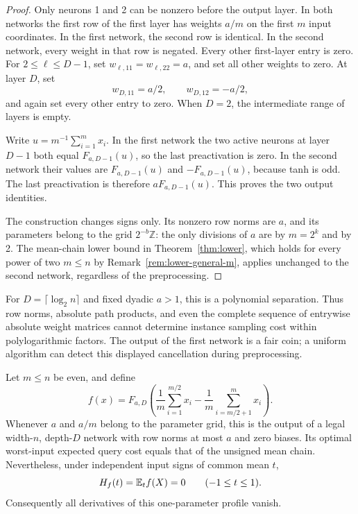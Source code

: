 \begin{proof}
Only neurons 1 and 2 can be nonzero before the output layer.
In both networks the first row of the first layer has weights
\(a/m\) on the first \(m\) input coordinates.  In the first network,
the second row is identical.  In the second network, every weight
in that row is negated.  Every other first-layer entry is zero.
For \(2\le\ell\le D-1\), set
\(w_{\ell,11}=w_{\ell,22}=a\), and set all other weights to zero.
At layer \(D\), set
\[
  w_{D,11}=a/2,\qquad w_{D,12}=-a/2,
\]
and again set every other entry to zero.  When \(D=2\), the
intermediate range of layers is empty.

Write \(u=m^{-1}\sum_{i=1}^m x_i\).  In the first network the two
active neurons at layer \(D-1\) both equal \(F_{a,D-1}(u)\), so
the last preactivation is zero.  In the second network their values
are \(F_{a,D-1}(u)\) and \(-F_{a,D-1}(u)\), because tanh is odd.
The last preactivation is therefore \(aF_{a,D-1}(u)\).
This proves the two output identities.

The construction changes signs only.  Its nonzero row norms are
\(a\), and its parameters belong to the grid \(2^{-b}\mathbb Z\):
the only divisions of \(a\) are by \(m=2^k\) and by 2.
The mean-chain lower bound in Theorem~\ref{thm:lower}, which holds
for every power of two \(m\le n\) by
Remark~\ref{rem:lower-general-m}, applies unchanged to the second
network, regardless of the preprocessing.
\end{proof}

For \(D=\lceil\log_2n\rceil\) and fixed dyadic \(a>1\), this
is a polynomial separation.  Thus row norms, absolute path products,
and even the complete sequence of entrywise absolute weight matrices
cannot determine instance sampling cost within polylogarithmic
factors.  The output of the first network is a fair coin; a uniform
algorithm can detect this displayed cancellation during preprocessing.

\begin{proposition}
\label{prop:profile-obstruction}
Let \(m\le n\) be even, and define
\[
 f(x)=F_{a,D}\left(
 \frac1m\sum_{i=1}^{m/2}x_i-
 \frac1m\sum_{i=m/2+1}^{m}x_i\right).
\]
Whenever \(a\) and \(a/m\) belong to the parameter grid, this is
the output of a legal width-\(n\), depth-\(D\) network with row
norms at most \(a\) and zero biases.  Its optimal worst-input
expected query cost equals that of the unsigned mean chain.
Nevertheless, under independent input signs of common mean \(t\),
\[
 H_f(t)=\mathbb E_t f(X)=0\qquad(-1\le t\le1).
\]
Consequently all derivatives of this one-parameter profile vanish.
\end{proposition}

